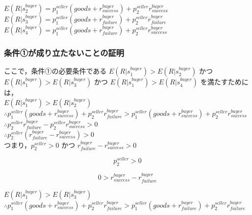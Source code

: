 \documentclass[twocolumn, a4j]{article}
\begin{document}
$ E(R|s^{buyer}_2)=p^{seller}_1 (goods + r^{buyer}_{success}) + p^{seller}_2 r^{buyer}_{success}$ \\

$ E(R|s^{buyer}_3)=p^{seller}_1 (goods + r^{buyer}_{failure}) + p^{seller}_2 r^{buyer}_{failure}$ \\

$ E(R|s^{buyer}_4)=p^{seller}_1 (goods + r^{buyer}_{failure}) + p^{seller}_2 r^{buyer}_{success}$ \\

\subsubsection{条件①が成り立たないことの証明}

ここで，条件①の必要条件である
$E(R|s^{buyer}_1)>E(R|s^{buyer}_2)$
かつ
$E(R|s^{buyer}_1)>E(R|s^{buyer}_3)$
かつ
$E(R|s^{buyer}_1)>E(R|s^{buyer}_4)$
を満たすためには，\\

$ E(R|s^{buyer}_1) > E(R|s^{buyer}_2)$ \\

$\therefore p^{seller}_1 (goods + r^{buyer}_{success}) + p^{seller}_2 r^{buyer}_{failure} > p^{seller}_1 (goods + r^{buyer}_{success}) + p^{seller}_2 r^{buyer}_{success}$ \\

$\therefore p^{seller}_2 r^{buyer}_{failure} - p^{seller}_2 r^{buyer}_{success} > 0$ \\

$\therefore p^{seller}_2 (r^{buyer}_{failure} - r^{buyer}_{success}) > 0$ \\

つまり，$ p^{seller}_2 > 0$ かつ $ r^{buyer}_{failure} - r^{buyer}_{success} > 0$

\begin{equation}
  p^{seller}_2 > 0
\end{equation}

\begin{equation}
\label{quad1}
  0 > r^{buyer}_{success} - r^{buyer}_{failure}
\end{equation}

$ E(R|s^{buyer}_1) > E(R|s^{buyer}_3)$ \\

$ \therefore p^{seller}_1(goods + r^{buyer}_{success}) + p^{seller}_2r^{buyer}_{failure}>
  p^{seller}_1(goods + r^{buyer}_{failure}) + p^{seller}_2r^{buyer}_{failure}$\\
\end{document}
